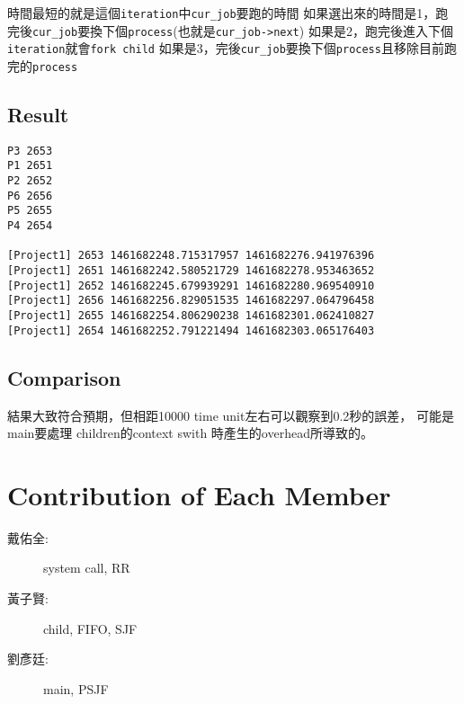 \documentclass{article}
\begin{document}
\begin{CJK}{UTF8}{bkai}
時間最短的就是這個\texttt{iteration}中\texttt{cur\_job}要跑的時間
如果選出來的時間是1，跑完後\texttt{cur\_job}要換下個\texttt{process}(也就是\texttt{cur\_job->next})
如果是2，跑完後進入下個\texttt{iteration}就會\texttt{fork child}
如果是3，完後\texttt{cur\_job}要換下個\texttt{process}且移除目前跑完的\texttt{process}

\subsection{Result}
\begin{verbatim}
P3 2653
P1 2651
P2 2652
P6 2656
P5 2655
P4 2654

[Project1] 2653 1461682248.715317957 1461682276.941976396
[Project1] 2651 1461682242.580521729 1461682278.953463652
[Project1] 2652 1461682245.679939291 1461682280.969540910
[Project1] 2656 1461682256.829051535 1461682297.064796458
[Project1] 2655 1461682254.806290238 1461682301.062410827
[Project1] 2654 1461682252.791221494 1461682303.065176403
\end{verbatim}
\subsection{Comparison}
結果大致符合預期，但相距10000 time unit左右可以觀察到0.2秒的誤差， 可能是main要處理
children的context swith 時產生的overhead所導致的。
\section{Contribution of Each Member}
\begin{description}
\item[戴佑全:] system call, RR
\item[黃子賢:] child, FIFO, SJF
\item[劉彥廷:] main, PSJF
\end{description}

\end{CJK}
\end{document}
